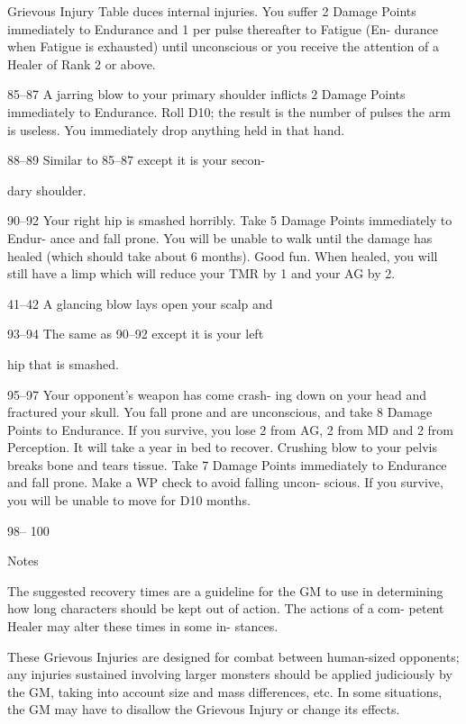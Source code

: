 \begin{Chapter}{Grievous Injury Table}
duces internal injuries. You suffer 2 
Damage Points immediately to Endurance 
and 1 per pulse thereafter to Fatigue (En-
durance when Fatigue is exhausted) until 
unconscious or you receive the attention 
of a Healer of Rank 2 or above. 

85–87   A jarring blow to your primary shoulder 
inflicts 2 Damage Points immediately to 
Endurance. Roll D10; the result is the 
number of pulses the arm is useless. You 
immediately drop anything held in that 
hand. 

88–89   Similar to 85–87 except it is your secon-

dary shoulder. 

90–92   Your right hip is smashed horribly. Take 
5 Damage Points immediately to Endur-
ance and fall prone. You will be unable to 
walk until the damage has healed (which 
should take about 6 months). Good fun. 
When healed, you will still have a limp 
which will reduce your TMR by 1 and 
your AG by 2. 

41–42   A glancing blow lays open your scalp and 

93–94   The same as 90–92 except it is your left 

hip that is smashed. 

95–97   Your opponent’s weapon has come crash-
ing down on your head and fractured your 
skull. You fall prone and are unconscious, 
and take 8 Damage Points to Endurance. 
If you survive, you lose 2 from AG, 2 
from MD and 2 from Perception. It will 
take a year in bed to recover. 
Crushing blow to your pelvis breaks bone 
and tears tissue. Take 7 Damage Points 
immediately to Endurance and fall prone. 
Make a WP check to avoid falling uncon-
scious. If you survive, you will be unable 
to move for D10 months. 

98–
100  

Notes 

The  suggested  recovery  times  are  a  guideline  for 
the GM to use in determining how long characters 
should be kept out of action. The actions of a com-
petent  Healer  may  alter  these  times  in  some  in-
stances. 

These  Grievous  Injuries  are  designed  for  combat 
between  human-sized  opponents;  any 
injuries 
sustained  involving  larger  monsters  should  be 
applied judiciously by the GM, taking into account 
size  and  mass  differences,  etc.  In  some  situations, 
the  GM  may  have  to disallow  the  Grievous  Injury 
or change its effects. 

 


\end{Chapter}
